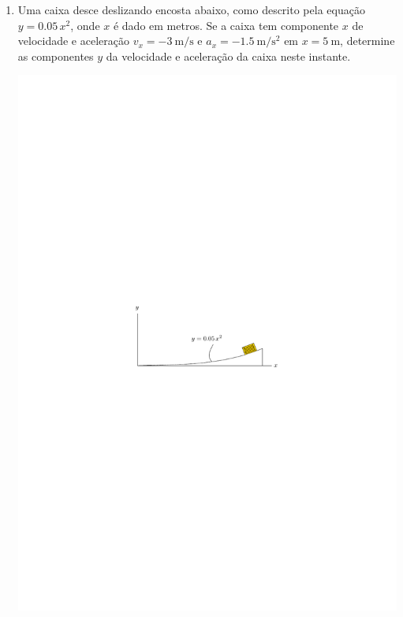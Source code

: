 \documentclass[a4paper,12pt]{article}
\begin{document}
\begin{enumerate}
		onde $v$ é dado em \SI{}{\meter/\second} e a direção positiva é para baixo. Se o corpo é solto a partir do repouso a uma altitude muito elevada, determine (a) a velocidade quando $t=\SI{5}{\second}$ e (b) a velocidade máxima possível ou final do corpo (quando $t\rightarrow\infty$)
		
		
		\textbf{Resposta}
		$
		\begin{cases}
		\text{(a) }v=\SI{45.5}{\meter/\second}\\
		\text{(b) }v=\SI{100}{\meter/\second}
		\end{cases}
		$
		
		\item Uma caixa desce deslizando encosta abaixo, como descrito pela equação $y=0.05\,x^{2}$, onde $x$ é dado em metros. Se a caixa tem componente $x$ de velocidade e aceleração $v_{x}=\SI{-3}{\meter/\second}$ e $a_{x}=\SI{-1.5}{\meter/\second^{2}}$ em $x=\SI{5}{\meter}$, determine as componentes $y$ da velocidade e aceleração da caixa neste instante.
		
		\vspace{-.5cm}
		\begin{flushright}
			\includegraphics[scale=1.3]{images/draw_2.pdf}
		\end{flushright}
		

\end{enumerate}
\end{document}
